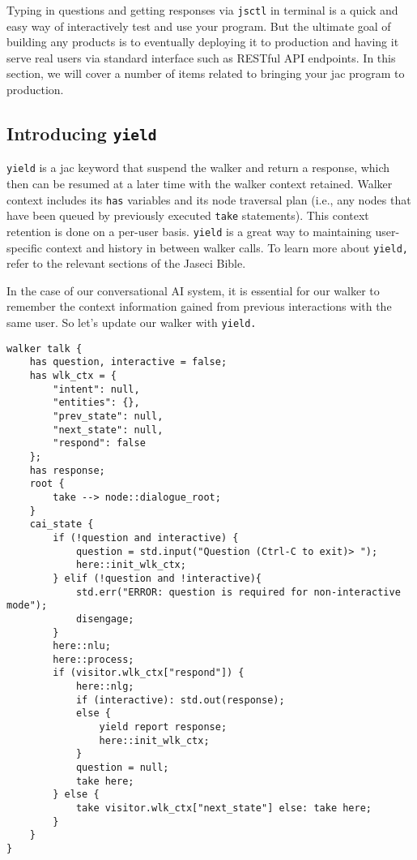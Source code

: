 Typing in questions and getting responses via
\passthrough{\lstinline!jsctl!} in terminal is a quick and easy way of
interactively test and use your program. But the ultimate goal of
building any products is to eventually deploying it to production and
having it serve real users via standard interface such as RESTful API
endpoints. In this section, we will cover a number of items related to
bringing your jac program to production.

\hypertarget{introducing-yield}{%
\subsection{\texorpdfstring{Introducing
\texttt{yield}}{Introducing yield}}\label{introducing-yield}}

\passthrough{\lstinline!yield!} is a jac keyword that suspend the walker
and return a response, which then can be resumed at a later time with
the walker context retained. Walker context includes its
\passthrough{\lstinline!has!} variables and its node traversal plan
(i.e., any nodes that have been queued by previously executed
\passthrough{\lstinline!take!} statements). This context retention is
done on a per-user basis. \passthrough{\lstinline!yield!} is a great way
to maintaining user-specific context and history in between walker
calls. To learn more about \passthrough{\lstinline!yield,!} refer to the
relevant sections of the Jaseci Bible.

In the case of our conversational AI system, it is essential for our
walker to remember the context information gained from previous
interactions with the same user. So let's update our walker with
\passthrough{\lstinline!yield.!}

\begin{lstlisting}
walker talk {
    has question, interactive = false;
    has wlk_ctx = {
        "intent": null,
        "entities": {},
        "prev_state": null,
        "next_state": null,
        "respond": false
    };
    has response;
    root {
        take --> node::dialogue_root;
    }
    cai_state {
        if (!question and interactive) {
            question = std.input("Question (Ctrl-C to exit)> ");
            here::init_wlk_ctx;
        } elif (!question and !interactive){
            std.err("ERROR: question is required for non-interactive mode");
            disengage;
        }
        here::nlu;
        here::process;
        if (visitor.wlk_ctx["respond"]) {
            here::nlg;
            if (interactive): std.out(response);
            else {
                yield report response;
                here::init_wlk_ctx;
            }
            question = null;
            take here;
        } else {
            take visitor.wlk_ctx["next_state"] else: take here;
        }
    }
}
\end{lstlisting}


